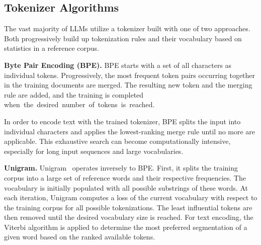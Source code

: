 \documentclass[11pt]{article}
\newcommand\todo[1]{\textcolor{red}{#1}}
\newcommand{\mb}[1]{\textcolor{blue}{MB: #1}}
\begin{document}
\subsection{Tokenizer Algorithms}

The vast majority of LLMs utilize a tokenizer built with one of two approaches. Both progressively build up tokenization rules and their vocabulary based on statistics in a reference corpus.

\textbf{Byte Pair Encoding (BPE).}
BPE \cite{sennrich2016bpe} starts with a set of all characters as individual tokens. Progressively, the most frequent token pairs occurring together in the training documents are merged.
The resulting new token and the merging rule are added, and the training is completed \mbox{when the desired number of tokens is reached.}

In order to encode text with the trained tokenizer, BPE splits the input into individual characters and applies the lowest-ranking merge rule until no more are applicable. This exhaustive search can become computationally intensive, especially for long input sequences and large vocabularies. 


\textbf{Unigram.}
%
Unigram~\cite{kudo2018sentencepiece} operates inversely to BPE. 
First, it splits the training corpus into a large set of reference words and their respective frequencies. The vocabulary is initially populated with all possible substrings of these words.
At each iteration, Unigram computes a loss of the current vocabulary with respect to the training corpus for all possible tokenizations. The least influential tokens are then removed until the desired vocabulary size is reached. 
%
For text encoding, the Viterbi algorithm is applied to determine the most preferred segmentation of a given word based on the ranked available tokens.
\end{document}
